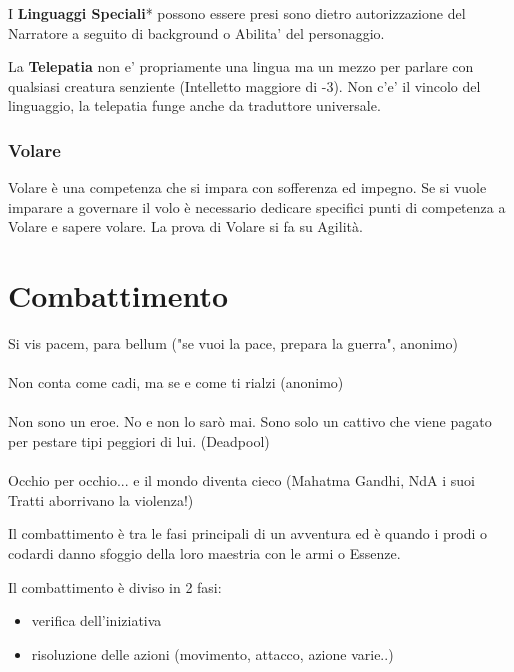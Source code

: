 \documentclass[a4paper,11pt,twoside,openany]{book}
\begin{document}
\bigskip

\begin{note}
I \textbf{Linguaggi Speciali}* possono essere presi sono dietro autorizzazione del Narratore a seguito di background o Abilita' del personaggio.
\end{note}

La \textbf{Telepatia} non e' propriamente una lingua ma un mezzo per parlare con qualsiasi creatura senziente (Intelletto maggiore di -3). Non c'e' il vincolo del linguaggio, la telepatia funge anche da traduttore universale.

\subsubsection{Volare}

\label{volare}

Volare è una competenza che si impara con sofferenza ed impegno. Se si vuole imparare a governare il volo è necessario dedicare specifici punti di competenza a Volare e sapere volare.
La prova di Volare si fa su Agilità.

\pagebreak

\section{Combattimento}

\label{combattimento}
\begin{tcolorbox}[enhanced,arc=5pt,boxrule=0.3pt]{
		Si vis pacem, para bellum ("se vuoi la pace, prepara la guerra", anonimo)\\\\
		Non conta come cadi, ma se e come ti rialzi (anonimo)\\\\
		Non sono un eroe. No e non lo sarò mai. Sono solo un cattivo che viene pagato per pestare tipi peggiori di lui. (Deadpool)\\\\
		Occhio per occhio... e il mondo diventa cieco (Mahatma Gandhi, NdA i suoi Tratti aborrivano la violenza!)
	}\end{tcolorbox}\medskip

Il combattimento è tra le fasi principali di un avventura ed è quando i prodi o codardi danno sfoggio della loro maestria con le armi o Essenze.

\bigskip

Il combattimento è diviso in 2 fasi:
\begin{itemize}
	\item verifica dell'iniziativa
	\item risoluzione delle azioni (movimento, attacco, azione varie..)
\end{itemize}
\end{document}
